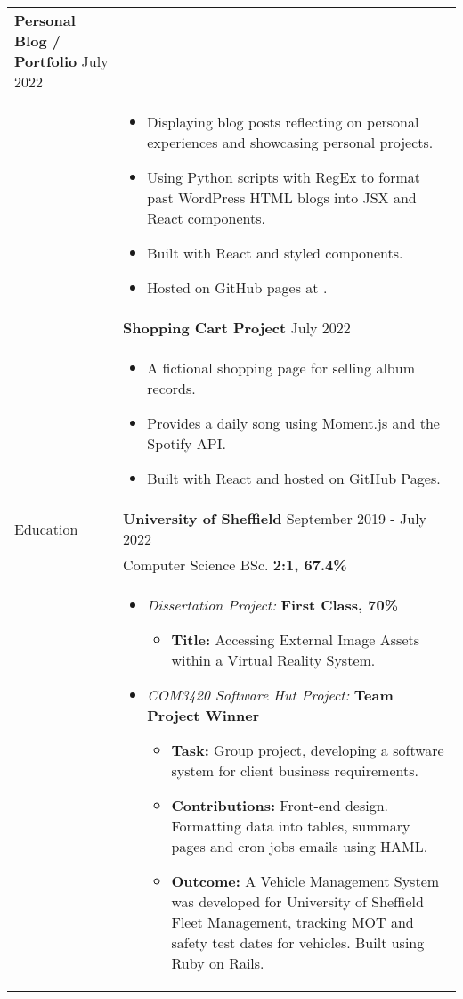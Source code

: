\documentclass[12pt]{article}
\begin{document}
\begin{minipage}[t][0pt]{\linewidth}
\begin{tabular}[t]{p{2cm} p{14cm}}
		\textbf{Personal Blog / Portfolio}  \hfill July 2022 \\ &
		\begin{itemize}
			\renewcommand{\labelitemi}{$\diamond$}
			\item Displaying blog posts reflecting on personal experiences and showcasing personal projects.
			\item Using Python scripts with RegEx to format past WordPress HTML blogs into JSX and React components.
			\item Built with React and styled components. 
			\item Hosted on GitHub pages at \href{https://jluong23.github.io/blog}{\color{Blue}{jluong23.github.io/blog}}.
		\end{itemize} \\ &
		
		\textbf{Shopping Cart Project}  \hfill July 2022 \\ &
		\begin{itemize}
			\renewcommand{\labelitemi}{$\diamond$}
			\item A fictional shopping page for selling album records. 
			\item Provides a daily song using Moment.js and the Spotify API.
			\item Built with React and hosted on GitHub Pages.
		\end{itemize} \\
	{Education} &
		\textbf{University of Sheffield} \hfill September 2019 - July 2022 \\ &
		Computer Science BSc. \hfill \textbf{2:1, 67.4\%}  \\ &
	    \begin{itemize}
    		\renewcommand{\labelitemi}{$\diamond$}
			\item \textit{Dissertation Project:} \hfill \textbf{First Class, 70\%} 
			\begin{itemize}
				\renewcommand{\labelitemii}{$\cdot$}
				\item \textbf{Title:} Accessing External Image Assets within a Virtual Reality System.
			\end{itemize}
			\item \textit{COM3420 Software Hut Project:} \hfill \textbf{Team Project Winner} 
			\begin{itemize}
				\renewcommand{\labelitemii}{$\cdot$}
				\item \textbf{Task:} Group project, developing a software system for client business requirements.
				\item \textbf{Contributions:} Front-end design. Formatting data into tables, summary pages and cron jobs emails using HAML. 
				\item \textbf{Outcome:} A Vehicle Management System was developed for University of Sheffield Fleet Management, tracking MOT and safety test
				dates for vehicles. Built using Ruby on Rails.
			\end{itemize}
		\end{itemize} \\


\end{tabular}
\end{minipage}
\end{document}
